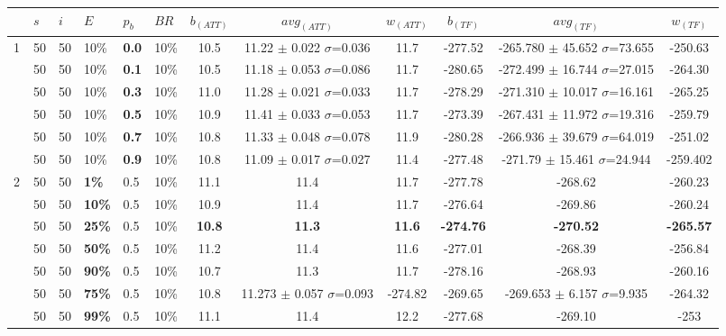 \begin{sidewaystable}
    \hspace*{-0.5cm}
    \begin{tabular}{|l|l|l|l|l|l||c|c|c|c|c|c|}
    \hline
    ~ & $s$ & $i$ & $E$ & $p_{b}$ & $BR$ & $b_{(ATT)}$ & $avg_{(ATT)}$ & $w_{(ATT)}$ & $b_{(TF)}$ & $avg_{(TF)}$ & $w_{(TF)}$ \\
    \hline
    1 & 50 & 50 & 10\% & \textbf{0.0} & 10\% & 10.5 & 11.22 $\pm$ 0.022 $\sigma$=0.036 & 11.7 & -277.52 & -265.780 $\pm$ 45.652 $\sigma$=73.655 & -250.63 \\
    ~ & 50 & 50 & 10\% & \textbf{0.1} & 10\% & 10.5 & 11.18 $\pm$ 0.053 $\sigma$=0.086 & 11.7 & -280.65 & -272.499 $\pm$ 16.744 $\sigma$=27.015 & -264.30 \\
    ~ & 50 & 50 & 10\% & \textbf{0.3} & 10\% & 11.0 & 11.28 $\pm$ 0.021 $\sigma$=0.033 & 11.7 & -278.29 & -271.310 $\pm$ 10.017 $\sigma$=16.161 & -265.25 \\
    ~ & 50 & 50 & 10\% & \textbf{0.5} & 10\% & 10.9 & 11.41 $\pm$ 0.033 $\sigma$=0.053 & 11.7 & -273.39 & -267.431 $\pm$ 11.972 $\sigma$=19.316 & -259.79\\
    ~ & 50 & 50 & 10\% & \textbf{0.7} & 10\% & 10.8 & 11.33 $\pm$ 0.048 $\sigma$=0.078 & 11.9 & -280.28 & -266.936 $\pm$ 39.679 $\sigma$=64.019 & -251.02\\
    ~ & 50 & 50 & 10\% & \textbf{0.9} & 10\% & 10.8 & 11.09 $\pm$ 0.017 $\sigma$=0.027 & 11.4 & -277.48 & -271.79 $\pm$ 15.461 $\sigma$=24.944 & -259.402 \\
    \hline
    2 & 50 & 50 & \textbf{1\%} & 0.5 & 10\% & 11.1 & 11.4 & 11.7 & -277.78 & -268.62 & -260.23 \\
    ~ & 50 & 50 & \textbf{10\%} & 0.5 & 10\% & 10.9 & 11.4 & 11.7 & -276.64 & -269.86 & -260.24 \\
    ~ & 50 & 50 & \textbf{25\%} & 0.5 & 10\% &  \textbf{10.8} & \textbf{11.3} & \textbf{11.6} & \textbf{-274.76} & \textbf{-270.52} & \textbf{-265.57} \\
    ~ & 50 & 50 & \textbf{50\%} & 0.5 & 10\% &  11.2 & 11.4 & 11.6 & -277.01 & -268.39 & -256.84 \\
    ~ & 50 & 50 & \textbf{90\%} & 0.5 & 10\% & 10.7 & 11.3 & 11.7 & -278.16 & -268.93 & -260.16 \\
    ~ & 50 & 50 & \textbf{75\%} & 0.5 & 10\% & 10.8 & 11.273 $\pm$ 0.057 $\sigma$=0.093 & -274.82 & -269.65 & -269.653 $\pm$ 6.157 $\sigma$=9.935 & -264.32 \\
    ~ & 50 & 50 & \textbf{99\%} & 0.5 & 10\% & 11.1 & 11.4 & 12.2 & -277.68 & -269.10 & -253 \\

\end{tabular}
\end{sidewaystable}
